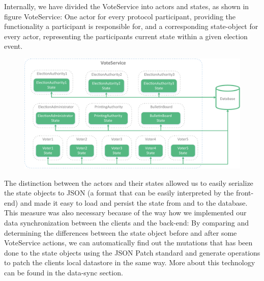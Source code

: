 Internally, we have divided the VoteService into actors and states, as shown in figure {VoteService}: One actor for every protocol participant, providing the functionality a participant is responsible for, and a corresponding state-object for every actor, representing the participants current state within a given election event. 

\begin{figure}[p]
\begin{center}
\includegraphics[scale=0.68]{assets/voteservice.pdf}
\label{VoteService}%
\end{center}
\end{figure}

The distinction between the actors and their states allowed us to easily serialize the state objects to JSON (a format that can be easily interpreted by the front-end) and made it easy to load and persist the state from and to the database. This measure was also necessary because of the way how we implemented our data synchronization between the clients and the back-end: By comparing and determining the differences between the state object before and after some VoteService actions, we can automatically find out the mutations that has been done to the state objects using the JSON Patch standard and generate operations to patch the clients local datastore in the same way. More about this technology can be found in the data-sync section.

